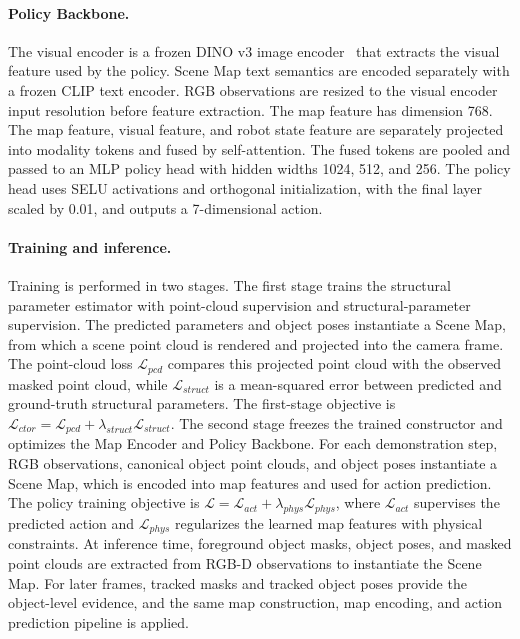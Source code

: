 \paragraph{Policy Backbone.}
The visual encoder is a frozen DINO v3 image encoder~\cite{simeoni2025dinov3} that extracts the visual feature used by the policy. Scene Map text semantics are encoded separately with a frozen CLIP text encoder. RGB observations are resized to the visual encoder input resolution before feature extraction. The map feature has dimension 768. The map feature, visual feature, and robot state feature are separately projected into modality tokens and fused by self-attention. The fused tokens are pooled and passed to an MLP policy head with hidden widths 1024, 512, and 256. The policy head uses SELU activations and orthogonal initialization, with the final layer scaled by 0.01, and outputs a 7-dimensional action.

\paragraph{Training and inference.}
Training is performed in two stages. The first stage trains the structural parameter estimator with point-cloud supervision and structural-parameter supervision. The predicted parameters and object poses instantiate a Scene Map, from which a scene point cloud is rendered and projected into the camera frame. The point-cloud loss $\mathcal{L}_{pcd}$ compares this projected point cloud with the observed masked point cloud, while $\mathcal{L}_{struct}$ is a mean-squared error between predicted and ground-truth structural parameters. The first-stage objective is $\mathcal{L}_{ctor} = \mathcal{L}_{pcd} + \lambda_{struct}\mathcal{L}_{struct}$.
The second stage freezes the trained constructor and optimizes the Map Encoder and Policy Backbone. For each demonstration step, RGB observations, canonical object point clouds, and object poses instantiate a Scene Map, which is encoded into map features and used for action prediction. The policy training objective is $\mathcal{L} = \mathcal{L}_{act} + \lambda_{phys}\mathcal{L}_{phys}$, where $\mathcal{L}_{act}$ supervises the predicted action and $\mathcal{L}_{phys}$ regularizes the learned map features with physical constraints. At inference time, foreground object masks, object poses, and masked point clouds are extracted from RGB-D observations to instantiate the Scene Map. For later frames, tracked masks and tracked object poses provide the object-level evidence, and the same map construction, map encoding, and action prediction pipeline is applied.

